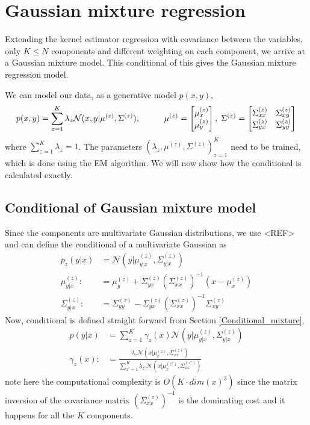 \section{Gaussian mixture regression}
Extending the kernel estimator regression with covariance between the variables, only $K \leq N$ components 
and different weighting on each component, we arrive at a Gaussian mixture model. This conditional of this
gives the Gaussian mixture regression model. 

We can model our data, as a generative model $p(x,y)$, 
$$p(x,y)= \sum_{z=1}^K \lambda_z \mathcal{N}(x,y|\mu^{(z)},\Sigma^{(z)}), \hspace{1cm}
\mu^{(z)}=\begin{bmatrix} \mu^{(z)}_x \\ \mu^{(z)}_y \end{bmatrix},\hspace{0.1cm} \Sigma^{(z)} =
\begin{bmatrix} \Sigma^{(z)}_{xx} & \Sigma^{(z)}_{xy}\\ \Sigma^{(z)}_{yx}& \Sigma^{(z)}_{yy}
\end{bmatrix}$$ where $\sum_{z=1}^K \lambda_z = 1$. The parameters $\left(\lambda_z,
\mu^{(z)}, \Sigma^{(z)} \right)_{z=1}^K$ need to be trained, which is done using the EM
algorithm. We will now show how the conditional is calculated exactly. 

\subsection{Conditional of Gaussian mixture model}
Since the components are multivariate Gaussian distributions, we use <REF> and can define the
conditional of a multivariate Gaussian as
\begin{align}
    p_z(y|x) &= \mathcal{N}(y|\mu^{(z)}_{y|x},\Sigma^{(z)}_{y|x} )\\
    \mu^{(z)}_{y|x} :&= \mu^{(z)}_y+\Sigma^{(z)}_{yx}(\Sigma^{(z)}_{xx})^{-1}(x-\mu^{(z)}_x)\\
    \Sigma^{(z)}_{y|x} :&= \Sigma^{(z)}_{yy}-\Sigma^{(z)}_{yx}(\Sigma^{(z)}_{xx})^{-1}\Sigma^{(z)}_{xy} 
\end{align}
Now, conditional is defined straight forward from Section \eqref{Conditional_mixture},
\begin{align}
    p(y|x) &= \sum_{z=1}^K \gamma_z(x) \mathcal{N}(y|\mu_{y|x}^{(z)},\Sigma_{y|x}^{(z)} ) \\
    \gamma_z(x) :&=\frac{\lambda_z \mathcal{N}(x|\mu_{x}^{(z)},\Sigma_{xx}^{(z)})}{\sum_{z^*=1}^K \lambda_{z^*}
\mathcal{N}(x|\mu_{x}^{(z^*)},\Sigma_{xx}^{(z^*)})}
\end{align}
note here the computational complexity is $O(K\cdot dim(x)^3)$ since the matrix inversion
of the covariance matrix $(\Sigma^{(z)}_{xx})^{-1}$ is the dominating cost and it happens
for all the $K$ components. 

